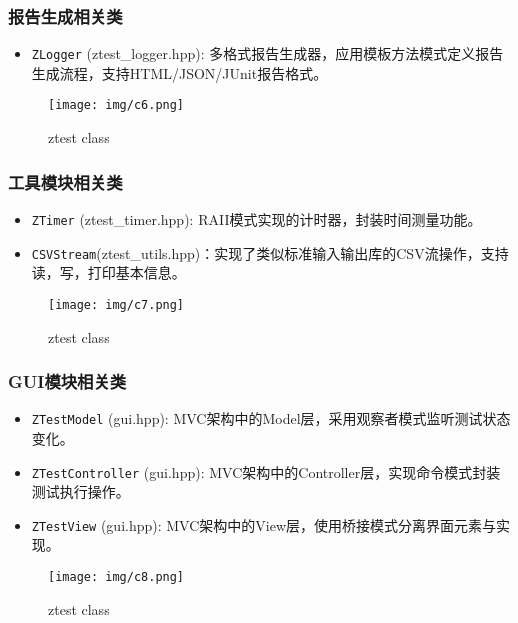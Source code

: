 \documentclass{article}
\begin{document}
\subsubsection{报告生成相关类}
\begin{itemize}
    \item \texttt{ZLogger} (ztest\_logger.hpp): 多格式报告生成器，应用模板方法模式定义报告生成流程，支持HTML/JSON/JUnit报告格式。
\end{itemize}
\begin{figure}[H]
    \centering
    \texttt{[image: img/c6.png]} %
    \caption{ ztest class}
    \label{fig:ztest class }
\end{figure}
\subsubsection{工具模块相关类}
\begin{itemize}
    \item \texttt{ZTimer} (ztest\_timer.hpp): RAII模式实现的计时器，封装时间测量功能。
    \item \texttt{CSVStream}(ztest\_utils.hpp)：实现了类似标准输入输出库的CSV流操作，支持读，写，打印基本信息。
\end{itemize}
\begin{figure}[H]
    \centering
    \texttt{[image: img/c7.png]} %
    \caption{ ztest class}
    \label{fig:ztest class }
\end{figure}
\subsubsection{GUI模块相关类}
\begin{itemize}
    \item \texttt{ZTestModel} (gui.hpp): MVC架构中的Model层，采用观察者模式监听测试状态变化。
    \item \texttt{ZTestController} (gui.hpp): MVC架构中的Controller层，实现命令模式封装测试执行操作。
    \item \texttt{ZTestView} (gui.hpp): MVC架构中的View层，使用桥接模式分离界面元素与实现。
\end{itemize}
\begin{figure}[H]
    \centering
    \texttt{[image: img/c8.png]} %
    \caption{ ztest class}
    \label{fig:ztest class }
\end{figure}
\end{document}

